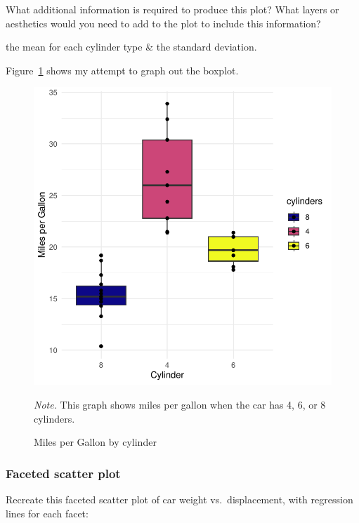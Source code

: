 \documentclass[
  man,
  floatsintext,
  longtable,
  nolmodern,
  notxfonts,
  notimes,
  colorlinks=true,linkcolor=blue,citecolor=blue,urlcolor=blue]{apa7}
\begin{document}
What additional information is required to produce this plot? What
layers or aesthetics would you need to add to the plot to include this
information?

the mean for each cylinder type \& the standard deviation.

Figure~\ref{fig-plot4-boxplot} shows my attempt to graph out the
boxplot.

\begin{figure}[H]

{\caption{{Miles per Gallon by cylinder}{\label{fig-plot4-boxplot}}}}

\includegraphics{data-visualization_files/figure-pdf/fig-plot4-boxplot-1.pdf}

{\noindent \emph{Note.} This graph shows miles per gallon when the car
has 4, 6, or 8 cylinders.}

\end{figure}

\subsubsection{Faceted scatter plot}\label{faceted-scatter-plot}

Recreate this faceted scatter plot of car weight vs.~displacement, with
regression lines for each facet:
\end{document}

